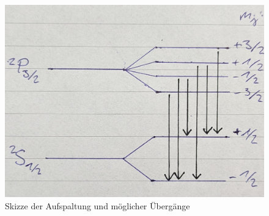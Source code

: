 \documentclass[ex, minted]{exercise_4.0}
\begin{document}
\begin{figure}[H]
    \centering
    \includegraphics[width=\textwidth]{diagram.jpg}
    \caption{Skizze der Aufspaltung und möglicher Übergänge}
\end{figure}
\end{document}
